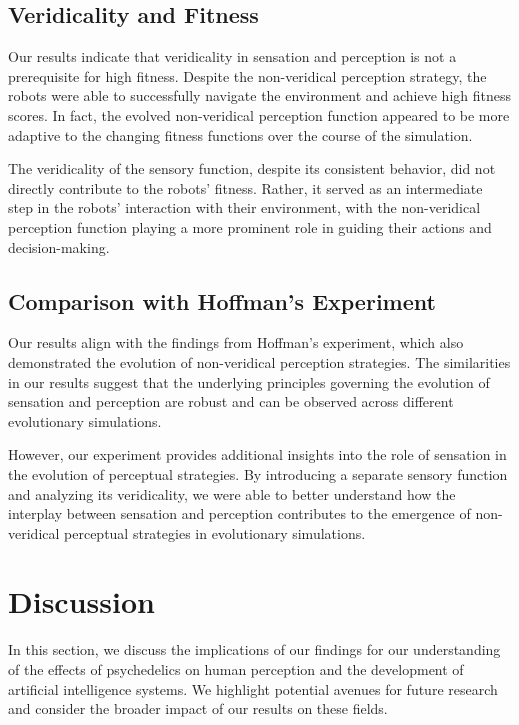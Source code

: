 \documentclass{article}[10pt]
\begin{document}
\subsection{Veridicality and Fitness}

Our results indicate that veridicality in sensation and perception is not a prerequisite for high fitness. Despite the non-veridical perception strategy, the robots were able to successfully navigate the environment and achieve high fitness scores. In fact, the evolved non-veridical perception function appeared to be more adaptive to the changing fitness functions over the course of the simulation.

The veridicality of the sensory function, despite its consistent behavior, did not directly contribute to the robots' fitness. Rather, it served as an intermediate step in the robots' interaction with their environment, with the non-veridical perception function playing a more prominent role in guiding their actions and decision-making.

\subsection{Comparison with Hoffman's Experiment}

Our results align with the findings from Hoffman's experiment, which also demonstrated the evolution of non-veridical perception strategies. The similarities in our results suggest that the underlying principles governing the evolution of sensation and perception are robust and can be observed across different evolutionary simulations.

However, our experiment provides additional insights into the role of sensation in the evolution of perceptual strategies. By introducing a separate sensory function and analyzing its veridicality, we were able to better understand how the interplay between sensation and perception contributes to the emergence of non-veridical perceptual strategies in evolutionary simulations.


\section{Discussion}

In this section, we discuss the implications of our findings for our understanding of the effects of psychedelics on human perception and the development of artificial intelligence systems. We highlight potential avenues for future research and consider the broader impact of our results on these fields.
\end{document}
